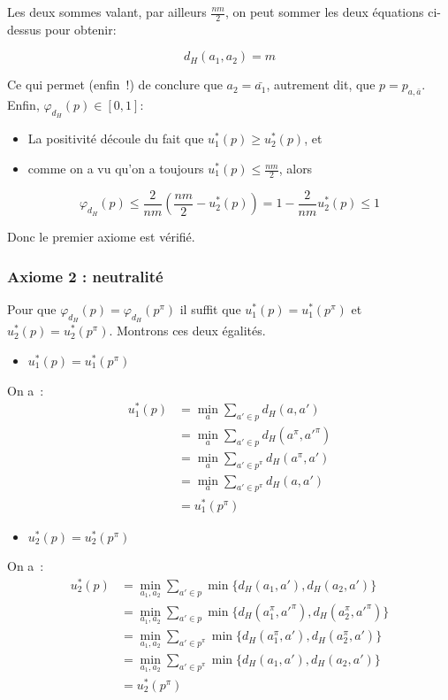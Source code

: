 \documentclass[11pt]{article}
\begin{document}
Les deux sommes valant, par ailleurs $\frac{nm}{2}$, on peut sommer les deux équations ci-dessus pour obtenir:

\[
d_H(a_1, a_2) = m
\]

Ce qui permet (enfin~!) de conclure que $a_2 = \bar{a_1}$, autrement dit, que $p = p_{a, \bar{a}}$.\\

Enfin, $\varphi_{d_H}(p) \in [0,1]$:
\begin{itemize}
	\item La positivité découle du fait que $u_1^*(p) \ge u_2^*(p)$, et
	\item comme on a vu qu'on a toujours $u_1^*(p) \le \frac{nm}{2}$, alors
\end{itemize}

\[
\varphi_{d_H}(p) 
\le
\frac{2}{nm}\left(\frac{nm}{2}-u_2^*(p)\right)
=
1-\frac{2}{nm}u_2^*(p)
\le
1
\]


Donc le premier axiome est vérifié.

\subsubsection{Axiome 2 : neutralité}

Pour que $\varphi_{d_H}(p) = \varphi_{d_H}(p^\pi)$ il suffit que $u_1^*(p) = u_1^*(p^\pi)$ et $u_2^*(p) = u_2^*(p^\pi)$. Montrons ces deux égalités.
\\

\begin{itemize}
  \item $u_1^*(p) = u_1^*(p^\pi)$
\end{itemize}

On a~:
\begin{align*}
u_1^*(p) 
&=
\min_a \sum_{a' \in p} d_H(a, a')\\
&=
\min_a \sum_{a' \in p} d_H(a^{\pi}, a'^{\pi})\\
&=
\min_a \sum_{a' \in p^{\pi}} d_H(a^{\pi}, a')\\
&=
\min_a \sum_{a' \in p^{\pi}} d_H(a, a')\\
&=
u_1^*(p^{\pi}) 
\end{align*}

\begin{itemize}
  \item $u_2^*(p) = u_2^*(p^\pi)$
\end{itemize}

On a~:
\begin{align*}
u_2^*(p)
&=
\min_{a_1,a_2}\sum_{a' \in p} \min \{ d_H(a_1, a'), d_H(a_2, a') \}\\
&=
\min_{a_1,a_2}\sum_{a' \in p} \min \{ d_H(a_1^{\pi}, a'^{\pi}), d_H(a_2^{\pi}, a'^{\pi}) \}\\
&=
\min_{a_1,a_2}\sum_{a' \in p^{\pi}} \min \{ d_H(a_1^{\pi}, a'), d_H(a_2^{\pi}, a') \}\\
&=
\min_{a_1,a_2}\sum_{a' \in p^{\pi}} \min \{ d_H(a_1, a'), d_H(a_2, a') \}\\
&=
u_2^*(p^{\pi})
\end{align*}
\end{document}
